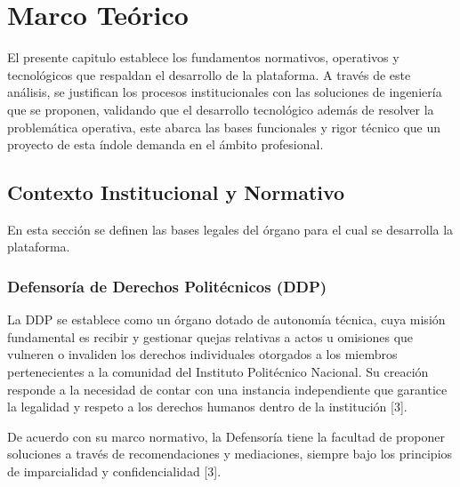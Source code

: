 
\chapter{Marco Teórico}
El presente capitulo establece los fundamentos normativos, operativos y tecnológicos que respaldan el desarrollo de la plataforma. A través de este análisis, se justifican los procesos institucionales con las soluciones de ingeniería que se proponen, validando que el desarrollo tecnológico además de resolver la problemática operativa, este abarca las bases funcionales y rigor técnico que un proyecto de esta índole demanda en el ámbito profesional.

\section{Contexto Institucional y Normativo}
En esta sección se definen las bases legales del órgano para el cual se desarrolla la plataforma.

\subsection{Defensoría de Derechos Politécnicos (DDP)}
La DDP se establece como un órgano dotado de autonomía técnica, cuya misión fundamental es recibir y gestionar quejas relativas a actos u omisiones que vulneren o invaliden los derechos individuales otorgados a los miembros pertenecientes a la comunidad del Instituto Politécnico Nacional. Su creación responde a la necesidad de contar con una instancia independiente que garantice la legalidad y respeto a los derechos humanos dentro de la institución [3].

De acuerdo con su marco normativo, la Defensoría tiene la facultad de proponer soluciones a través de recomendaciones y mediaciones, siempre bajo los principios de imparcialidad y confidencialidad [3].

